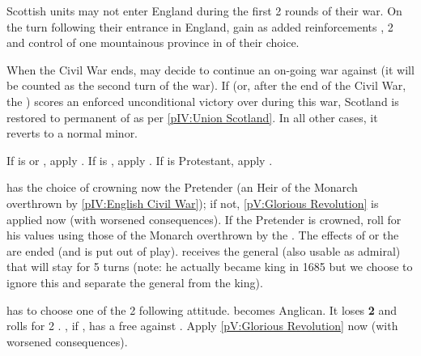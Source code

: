 \phmil
\aparag Scottish units may not enter England during the first 2 rounds of
their war.
\aparag On the turn following their entrance in England, \royal gain as added
reinforcements , 2 \LD and control of one mountainous
province in \paysecosse of their choice.

\phpaix
\aparag When the Civil War ends, \ENG may decide to continue an on-going war
against \paysecosse (it will be counted as the second turn of the war).
\aparag If \ENG (\royal or, after the end of the Civil War, the \parl) scores
an enforced unconditional victory over \paysecosse during this war, Scotland
is restored to permanent \VASSAL of \ENG as per \ref{pIV:Union Scotland}.  In
all other cases, it reverts to a normal minor.






\phevnt
\aparag If \ENG is \PROTANG or \CATHCO, apply .
\aparag If \ENG is \CATHCR, apply .
\aparag If \ENG is Protestant, apply .



\phevnt
\aparag \ENG has the choice of crowning now the Pretender (an Heir of the
Monarch overthrown by \ref{pIV:English Civil War}); if not, \ref{pV:Glorious
  Revolution} is applied now (with worsened consequences).
\aparag If the Pretender is crowned, roll for his values using those of the
Monarch overthrown by the . The effects of
 or the  are ended (and
\leaderCromwell is put out of play).
\aparag \ENG receives the general (also usable as admiral)  that will stay for 5 turns (note: he actually became king in 1685 but
we choose to ignore this and separate the general from the king).



\phevnt
\aparag \ENG has to choose one of the 2 following attitude.
\bparag \ENG becomes Anglican. It loses {\bf 2} \STAB and rolls for 2 \REVOLT
.
\bparag \SPA, if \CATHCR, has a free \CB against \ENG.
\aparag[Refusal]
\bparag Apply \ref{pV:Glorious Revolution} now (with worsened consequences).


